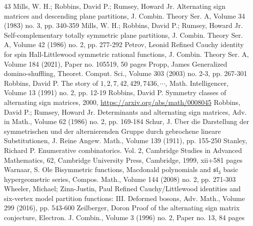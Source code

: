 \documentclass[10pt,a4paper]{article}
\theoremstyle{definition}
\begin{document}
\begin{thebibliography}{43}
 Mills, W. H.; Robbins, David P.; Rumsey, Howard Jr. Alternating sign matrices and descending plane partitions, J. Combin. Theory Ser. A, Volume 34 (1983) no. 3, pp. 340-359
 Mills, W. H.; Robbins, David P.; Rumsey, Howard Jr. Self-complementary totally symmetric plane partitions, J. Combin. Theory Ser. A, Volume 42 (1986) no. 2, pp. 277-292
 Petrov, Leonid Refined Cauchy identity for spin Hall-Littlewood symmetric rational functions, J. Combin. Theory Ser. A, Volume 184 (2021), Paper no. 105519, 50 pages
 Propp, James Generalized domino-shuffling, Theoret. Comput. Sci., Volume 303 (2003) no. 2-3, pp. 267-301
 Robbins, David P. The story of $1,2,7,42,429,7436,\cdots $, Math. Intelligencer, Volume 13 (1991) no. 2, pp. 12-19
 Robbins, David P. Symmetry classes of alternating sign matrices, 2000, \url{https://arxiv.org/abs/math/0008045}
 Robbins, David P.; Rumsey, Howard Jr. Determinants and alternating sign matrices, Adv. in Math., Volume 62 (1986) no. 2, pp. 169-184
 Schur, J. Über die Darstellung der symmetrischen und der alternierenden Gruppe durch gebrochene lineare Substitutionen, J. Reine Angew. Math., Volume 139 (1911), pp. 155-250
 Stanley, Richard P. Enumerative combinatorics. Vol. 2, Cambridge Studies in Advanced Mathematics, 62, Cambridge University Press, Cambridge, 1999, xii+581 pages
 Warnaar, S. Ole Bisymmetric functions, Macdonald polynomials and $\mathfrak{sl}_3$ basic hypergeometric series, Compos. Math., Volume 144 (2008) no. 2, pp. 271-303
 Wheeler, Michael; Zinn-Justin, Paul Refined Cauchy/Littlewood identities and six-vertex model partition functions: III. Deformed bosons, Adv. Math., Volume 299 (2016), pp. 543-600
 Zeilberger, Doron Proof of the alternating sign matrix conjecture, Electron. J. Combin., Volume 3 (1996) no. 2, Paper no. 13, 84 pages
\end{thebibliography}
\end{document}
